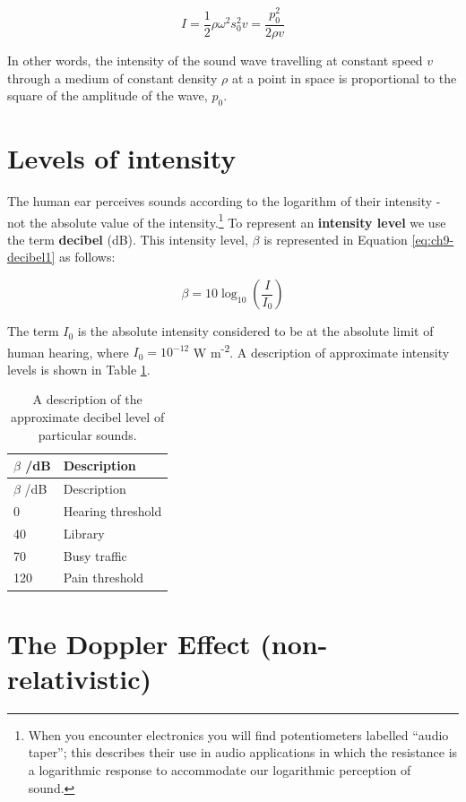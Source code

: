 \documentclass[
]{book}
\begin{document}
\begin{equation}
I = \frac{1}{2}\rho \omega^2 s_0^2 v = \frac{p_0^2}{2\rho v}
\label{eq:ch9-waveintensity3}
\end{equation}

In other words, the intensity of the sound wave travelling at constant speed \(v\) through a medium of constant density \(\rho\) at a point in space is proportional to the square of the amplitude of the wave, \(p_0\).

\hypertarget{sec:ch9-intensitylevels}{%
\section{Levels of intensity}\label{sec:ch9-intensitylevels}}

The human ear perceives sounds according to the logarithm of their intensity - not the absolute value of the intensity.\footnote{When you encounter electronics you will find potentiometers labelled ``audio taper''; this describes their use in audio applications in which the resistance is a logarithmic response to accommodate our logarithmic perception of sound. } To represent an \textbf{intensity level} we use the term \textbf{decibel} (dB). This intensity level, \(\beta\) is represented in Equation \eqref{eq:ch9-decibel1} as follows:

\begin{equation}
\beta = 10 \log_{10}\left(\frac{I}{I_0}\right)
\label{eq:ch9-decibel1}
\end{equation}

The term \(I_0\) is the absolute intensity considered to be at the absolute limit of human hearing, where \(I_0 = 10^{-12}\) W m\textsuperscript{-2}. A description of approximate intensity levels is shown in Table \ref{tab:ch9-decibeldescription1}.

\begin{longtable}[]{@{}ll@{}}
\caption{\label{tab:ch9-decibeldescription1} A description of the approximate decibel level of particular sounds.}\tabularnewline
\toprule
\(\beta\) /dB & Description\tabularnewline
\midrule
\endfirsthead
\toprule
\(\beta\) /dB & Description\tabularnewline
\midrule
\endhead
0 & Hearing threshold\tabularnewline
40 & Library\tabularnewline
70 & Busy traffic\tabularnewline
120 & Pain threshold\tabularnewline
\bottomrule
\end{longtable}

\hypertarget{sec:ch9-dopplereffect1}{%
\section{The Doppler Effect (non-relativistic)}\label{sec:ch9-dopplereffect1}}
\end{document}
